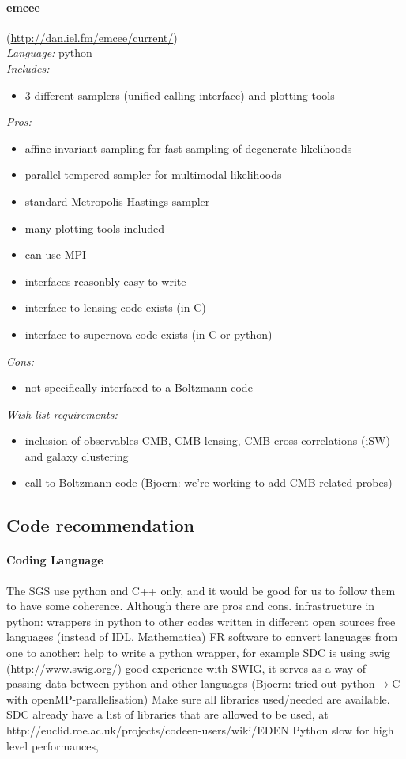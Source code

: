 \paragraph{emcee}(\url{http://dan.iel.fm/emcee/current/})\\
{\it Language:} python\\
{\it Includes:}
\begin{itemize}
 \item 3 different samplers (unified calling interface) and plotting tools
\end{itemize}
{\it Pros:} 
\begin{itemize}
 \item affine invariant sampling for fast sampling of degenerate likelihoods
 \item parallel tempered sampler for multimodal likelihoods
 \item standard Metropolis-Hastings sampler
 \item many plotting tools included
 \item can use MPI
 \item interfaces reasonbly easy to write
 \item interface to lensing code exists (in C)
 \item interface to supernova code exists (in C or python)
 \end{itemize}
{\it Cons:} 
\begin{itemize}
 \item not specifically interfaced to a Boltzmann code
\end{itemize}
{\it Wish-list requirements: }
\begin{itemize}
 \item inclusion of observables CMB, CMB-lensing, CMB cross-correlations (iSW) and galaxy clustering
 \item call to Boltzmann code (Bjoern: we’re working to add CMB-related probes)
\end{itemize}


\subsection{Code recommendation}

\paragraph{Coding Language}
The SGS use python and C++ only, and it would be good for us to follow them to have some coherence. Although there are pros and cons.
infrastructure in python: wrappers in python to other codes written in different open sources free languages (instead of IDL, Mathematica)
FR software to convert languages from one to another: help to write a python wrapper, for example SDC is using swig (http://www.swig.org/)
good experience with SWIG, it serves as a way of passing data between python and other languages (Bjoern: tried out python$\rightarrow$C with openMP-parallelisation)
Make sure all libraries used/needed are available. 
SDC already have a list of libraries that are allowed to be used, at http://euclid.roe.ac.uk/projects/codeen-users/wiki/EDEN
Python slow for high level performances, 

